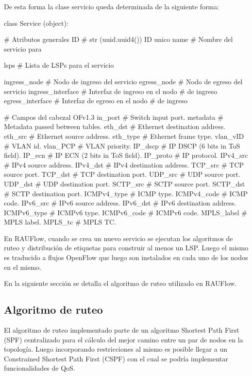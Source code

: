 \newpage
De esta forma la clase servicio queda determinada de la siguiente forma:\\

\begin{python}
class Service (object):

		# Atributos generales
		ID 				    # str (uuid.uuid4()) ID unico  
		name 				# Nombre del servicio para 
							
		lsps				# Lista de LSPs para el servicio
		
		ingress_node		# Nodo de ingreso del servicio
		egress_node 		# Nodo de egreso del servicio			
		ingress_interface 	# Interfaz de ingreso en el nodo 
							# de ingreso		
		egress_interface 	# Interfaz de egreso en el nodo 
							# de ingreso 
        
		# Campos del cabezal OFv1.3 
		in_port			# Switch input port. 
		metadata 		# Metadata passed between tables. 
		eth_dst 		# Ethernet destination address.
		eth_src 		# Ethernet source address. 
		eth_type 		# Ethernet frame type. 
		vlan_vID 		# VLAN id. 
		vlan_PCP		# VLAN priority. 
		IP_dscp 		# IP DSCP (6 bits in ToS field). 
		IP_ecn  		# IP ECN (2 bits in ToS field). 
		IP_proto		# IP protocol. 
		IPv4_src 		# IPv4 source address. 
		IPv4_dst 		# IPv4 destination address. 
		TCP_src 		# TCP source port. 
		TCP_dst 		# TCP destination port. 
		UDP_src 		# UDP source port. 
		UDP_dst 		# UDP destination port. 
		SCTP_src 		# SCTP source port. 
		SCTP_dst 		# SCTP destination port. 
		ICMPv4_type 	# ICMP type. 
		ICMPv4_code 	# ICMP code. 
		IPv6_src 		# IPv6 source address. 
		IPv6_dst 		# IPv6 destination address. 
		ICMPv6_type 	# ICMPv6 type. 
		ICMPv6_code 	# ICMPv6 code. 
		MPLS_label 		# MPLS label. 
		MPLS_tc 		# MPLS TC. 
		
\end{python}

En RAUFlow, cuando se crea un nuevo servicio se ejecutan los algoritmos de ruteo y distribución de etiquetas para construir al menos un LSP. Luego el mismo es traducido a flujos OpenFlow que luego son instalados en cada uno de los nodos en el mismo. 

En la siguiente secci\'on se detalla el algoritmo de ruteo utilizado en RAUFlow.

\subsection{Algoritmo de ruteo}
El algoritmo de ruteo implementado parte de un algoritmo Shortest Path First (SPF) centralizado para el c\'alculo del mejor camino entre un par de nodos en la topolog\'ia. Luego incorporando restricciones al mismo es posible llegar a un Constrained Shortest Path First (CSPF) con el cual se podr\'ia implementar funcionalidades de QoS.\\

